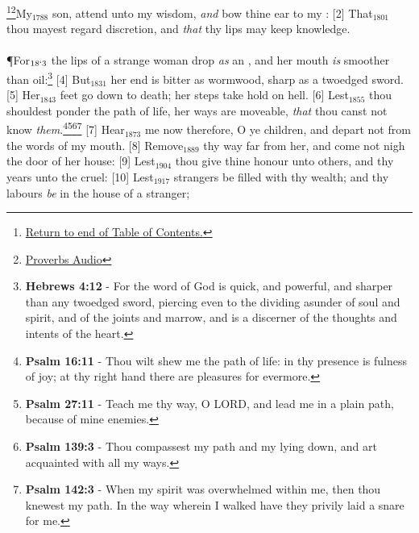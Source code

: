 \footnote{\textcolor[cmyk]{0.99998,1,0,0}{\hyperlink{TOC}{Return to end of Table of Contents.}}}\footnote{\href{https://audiobible.com/bible/bible.html}{\textcolor[cmyk]{0.99998,1,0,0}{Proverbs Audio}}}\textcolor[cmyk]{0.99998,1,0,0}{My\textcolor{jungle}{$_{1788}$} son, attend unto my wisdom, \emph{and} bow thine ear to my :}
[2] \textcolor[cmyk]{0.99998,1,0,0}{That\textcolor{jungle}{$_{1801}$} thou mayest regard discretion, and \emph{that} thy lips may keep knowledge.}\\
\\
\P \textcolor[cmyk]{0.99998,1,0,0}{For\textcolor{jungle}{$_{18`3}$} the lips of a strange woman drop \emph{as} an , and her mouth \emph{is} smoother than oil:}\footnote{\textbf{Hebrews 4:12} - For the word of God is quick, and powerful, and sharper than any twoedged sword, piercing even to the dividing asunder of soul and spirit, and of the joints and marrow, and is a discerner of the thoughts and intents of the heart.}
[4] \textcolor[cmyk]{0.99998,1,0,0}{But\textcolor{jungle}{$_{1831}$} her end is bitter as wormwood, sharp as a twoedged sword.}
[5] \textcolor[cmyk]{0.99998,1,0,0}{Her\textcolor{jungle}{$_{1843}$} feet go down to death; her steps take hold on hell.}
[6] \textcolor[cmyk]{0.99998,1,0,0}{Lest\textcolor{jungle}{$_{1855}$} thou shouldest ponder the path of life, her ways are moveable, \emph{that} thou canst not know \emph{them}.}\footnote{\textbf{Psalm 16:11} - Thou wilt shew me the path of life: in thy presence is fulness of joy; at thy right hand there are pleasures for evermore.}\footnote{\textbf{Psalm 27:11} - Teach me thy way, O LORD, and lead me in a plain path, because of mine enemies.}\footnote{\textbf{Psalm 139:3} - Thou compassest my path and my lying down, and art acquainted with all my ways.}\footnote{\textbf{Psalm 142:3} - When my spirit was overwhelmed within me, then thou knewest my path. In the way wherein I walked have they privily laid a snare for me.}
[7] \textcolor[cmyk]{0.99998,1,0,0}{Hear\textcolor{jungle}{$_{1873}$} me now therefore, O ye children, and depart not from the words of my mouth.}
[8] \textcolor[cmyk]{0.99998,1,0,0}{Remove\textcolor{jungle}{$_{1889}$} thy way far from her, and come not nigh the door of her house:}
[9] \textcolor[cmyk]{0.99998,1,0,0}{Lest\textcolor{jungle}{$_{1904}$} thou give thine honour unto others, and thy years unto the cruel:}
[10] \textcolor[cmyk]{0.99998,1,0,0}{Lest\textcolor{jungle}{$_{1917}$} strangers be filled with thy wealth; and thy labours \emph{be} in the house of a stranger;}
